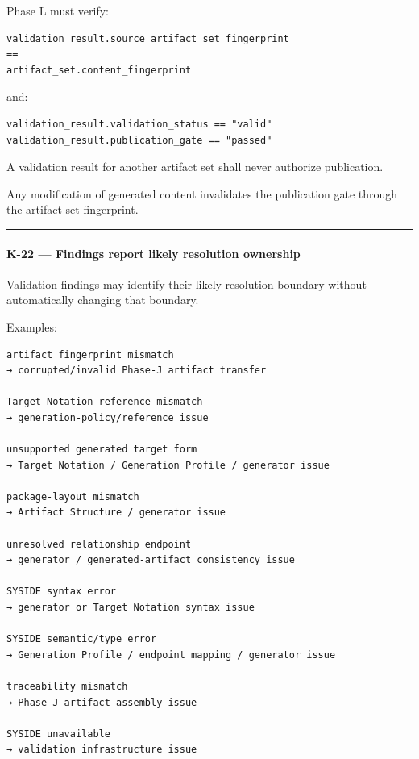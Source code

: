 Phase L must verify:

\begin{verbatim}
validation_result.source_artifact_set_fingerprint
==
artifact_set.content_fingerprint
\end{verbatim}

and:

\begin{verbatim}
validation_result.validation_status == "valid"
validation_result.publication_gate == "passed"
\end{verbatim}

A validation result for another artifact set shall never authorize publication.

Any modification of generated content invalidates the publication gate through the artifact-set fingerprint.

\begin{center}\rule{0.5\linewidth}{0.5pt}\end{center}

\hypertarget{k-22--findings-report-likely-resolution-ownership}{%
\paragraph{K-22 --- Findings report likely resolution ownership}\label{k-22--findings-report-likely-resolution-ownership}}

Validation findings may identify their likely resolution boundary without automatically changing that boundary.

Examples:

\begin{verbatim}
artifact fingerprint mismatch
→ corrupted/invalid Phase-J artifact transfer

Target Notation reference mismatch
→ generation-policy/reference issue

unsupported generated target form
→ Target Notation / Generation Profile / generator issue

package-layout mismatch
→ Artifact Structure / generator issue

unresolved relationship endpoint
→ generator / generated-artifact consistency issue

SYSIDE syntax error
→ generator or Target Notation syntax issue

SYSIDE semantic/type error
→ Generation Profile / endpoint mapping / generator issue

traceability mismatch
→ Phase-J artifact assembly issue

SYSIDE unavailable
→ validation infrastructure issue
\end{verbatim}

